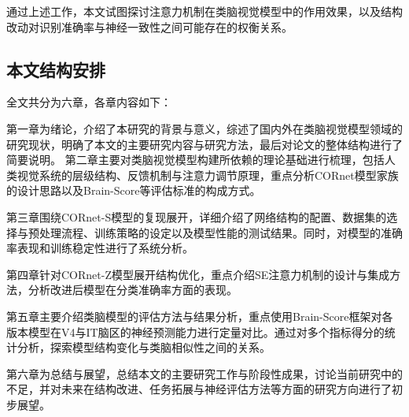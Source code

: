 通过上述工作，本文试图探讨注意力机制在类脑视觉模型中的作用效果，以及结构改动对识别准确率与神经一致性之间可能存在的权衡关系。

\subsection{本文结构安排}

全文共分为六章，各章内容如下：

第一章为绪论，介绍了本研究的背景与意义，综述了国内外在类脑视觉模型领域的研究现状，明确了本文的主要研究内容与研究方法，最后对论文的整体结构进行了简要说明。
第二章主要对类脑视觉模型构建所依赖的理论基础进行梳理，包括人类视觉系统的层级结构、反馈机制与注意力调节原理，重点分析CORnet模型家族的设计思路以及Brain-Score等评估标准的构成方式。

第三章围绕CORnet-S模型的复现展开，详细介绍了网络结构的配置、数据集的选择与预处理流程、训练策略的设定以及模型性能的测试结果。同时，对模型的准确率表现和训练稳定性进行了系统分析。

第四章针对CORnet-Z模型展开结构优化，重点介绍SE注意力机制的设计与集成方法，分析改进后模型在分类准确率方面的表现。

第五章主要介绍类脑模型的评估方法与结果分析，重点使用Brain-Score框架对各版本模型在V4与IT脑区的神经预测能力进行定量对比。通过对多个指标得分的统计分析，探索模型结构变化与类脑相似性之间的关系。

第六章为总结与展望，总结本文的主要研究工作与阶段性成果，讨论当前研究中的不足，并对未来在结构改进、任务拓展与神经评估方法等方面的研究方向进行了初步展望。


